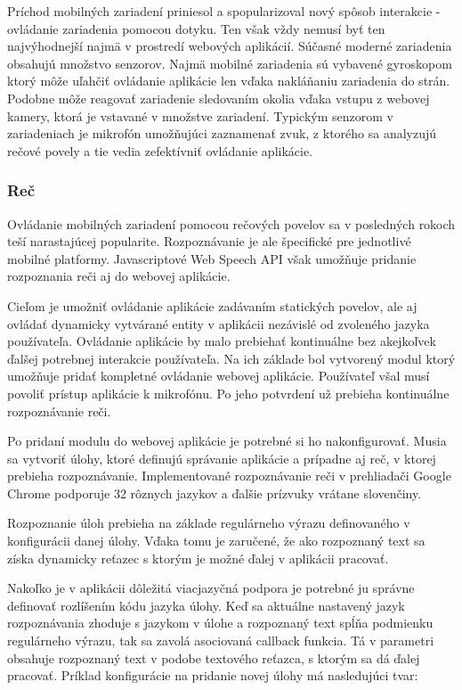 Príchod mobilných zariadení priniesol a spopularizoval nový spôsob interakcie - ovládanie zariadenia pomocou dotyku. Ten však vždy nemusí byť ten najvýhodnejší najmä v prostredí webových aplikácií. Súčasné moderné zariadenia obsahujú množstvo senzorov. Najmä mobilné zariadenia sú vybavené gyroskopom ktorý môže uľahčiť ovládanie aplikácie len vďaka nakláňaniu zariadenia do strán. Podobne môže reagovať zariadenie sledovaním okolia vďaka vstupu z webovej kamery, ktorá je vstavané v množstve zariadení. Typickým senzorom v zariadeniach je mikrofón umožňujúci zaznamenať zvuk, z ktorého sa analyzujú rečové povely a tie vedia zefektívniť ovládanie aplikácie.

\subsubsection{Reč} %
\label{ssub:re_}

Ovládanie mobilných zariadení pomocou rečových povelov sa v posledných rokoch teší narastajúcej popularite. Rozpoznávanie je ale špecifické pre jednotlivé mobilné platformy. Javascriptové Web Speech API však umožňuje pridanie rozpoznania reči aj do webovej aplikácie. 

Cieľom je umožniť ovládanie aplikácie zadávaním statických povelov, ale aj ovládať dynamicky vytvárané entity v aplikácii nezávislé od zvoleného jazyka používateľa. Ovládanie aplikácie by malo prebiehať kontinuálne bez akejkoľvek ďalšej potrebnej interakcie používateľa. Na ich základe bol vytvorený modul ktorý umožňuje pridať kompletné ovládanie webovej aplikácie. Používateľ všal musí povoliť prístup aplikácie k mikrofónu. Po jeho potvrdení už prebieha kontinuálne rozpoznávanie reči.

Po pridaní modulu do webovej aplikácie je potrebné si ho nakonfigurovať. Musia sa vytvoriť úlohy, ktoré definujú správanie aplikácie a prípadne aj reč, v ktorej prebieha rozpoznávanie. Implementované rozpoznávanie reči v prehliadači Google Chrome podporuje 32 rôznych jazykov a ďalšie prízvuky vrátane slovenčiny.

Rozpoznanie úloh prebieha na základe regulárneho výrazu definovaného v konfigurácii danej úlohy. Vďaka tomu je zaručené, že ako rozpoznaný text sa získa dynamicky reťazec s ktorým je možné ďalej v aplikácii pracovať. 

Nakoľko je v aplikácii dôležitá viacjazyčná podpora je potrebné ju správne definovať rozlíšením kódu jazyka úlohy. Keď sa aktuálne nastavený jazyk rozpoznávania zhoduje s jazykom v úlohe a rozpoznaný text spĺňa podmienku regulárneho výrazu, tak sa zavolá asociovaná callback funkcia. Tá v parametri obsahuje rozpoznaný text v podobe textového reťazca, s ktorým sa dá ďalej pracovať. Príklad konfigurácie na pridanie novej úlohy má nasledujúci tvar:


